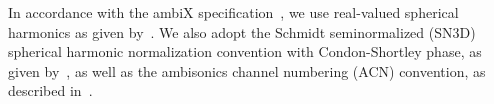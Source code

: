 In accordance with the ambiX specification~\citep{Nachbar2011},
we use real-valued spherical harmonics as given by~.
We also adopt the Schmidt seminormalized (SN3D) spherical harmonic normalization convention with Condon-Shortley phase,
as given by~,
as well as the ambisonics channel numbering (ACN) convention, as described in~.